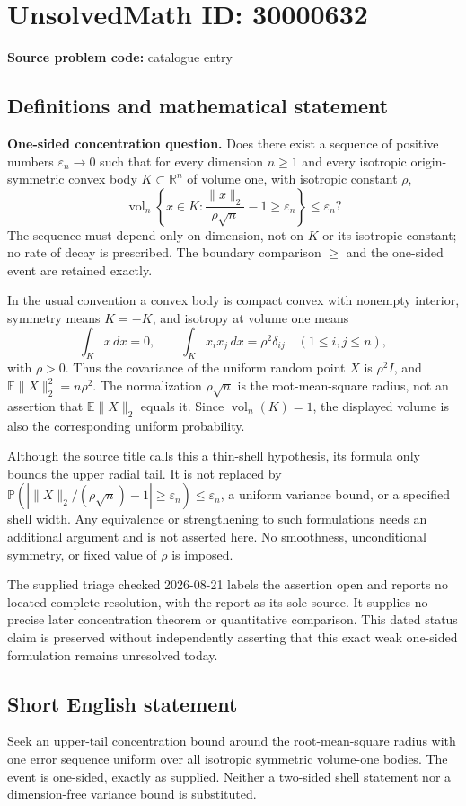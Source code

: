 \documentclass[11pt]{article}
\newcommand{\R}{\mathbb{R}}
\begin{document}
\section*{UnsolvedMath ID: 30000632}
\textbf{Source problem code:} catalogue entry
\subsection{Definitions and mathematical statement}
\textbf{One-sided concentration question.} Does there exist a sequence of positive numbers \(\varepsilon_n\to0\) such that for every dimension \(n\ge1\) and every isotropic origin-symmetric convex body \(K\subset\R^n\) of volume one, with isotropic constant \(\rho\),\[\operatorname{vol}_n\left\{x\in K:\frac{\|x\|_2}{\rho\sqrt n}-1\ge\varepsilon_n\right\}\le\varepsilon_n?\] The sequence must depend only on dimension, not on \(K\) or its isotropic constant; no rate of decay is prescribed. The boundary comparison \(\ge\) and the one-sided event are retained exactly.\par In the usual convention a convex body is compact convex with nonempty interior, symmetry means \(K=-K\), and isotropy at volume one means\[\int_Kx\,dx=0,\qquad \int_Kx_ix_j\,dx=\rho^2\delta_{ij}\quad(1\le i,j\le n),\] with \(\rho>0\). Thus the covariance of the uniform random point \(X\) is \(\rho^2I\), and \(\mathbb E\|X\|_2^2=n\rho^2\). The normalization \(\rho\sqrt n\) is the root-mean-square radius, not an assertion that \(\mathbb E\|X\|_2\) equals it. Since \(\operatorname{vol}_n(K)=1\), the displayed volume is also the corresponding uniform probability.\par Although the source title calls this a thin-shell hypothesis, its formula only bounds the upper radial tail. It is not replaced by \(\mathbb P(|\|X\|_2/(\rho\sqrt n)-1|\ge\varepsilon_n)\le\varepsilon_n\), a uniform variance bound, or a specified shell width. Any equivalence or strengthening to such formulations needs an additional argument and is not asserted here. No smoothness, unconditional symmetry, or fixed value of \(\rho\) is imposed.\par The supplied triage checked 2026-08-21 labels the assertion open and reports no located complete resolution, with the report as its sole source. It supplies no precise later concentration theorem or quantitative comparison. This dated status claim is preserved without independently asserting that this exact weak one-sided formulation remains unresolved today.
\subsection{Short English statement}
Seek an upper-tail concentration bound around the root-mean-square radius with one error sequence uniform over all isotropic symmetric volume-one bodies. The event is one-sided, exactly as supplied. Neither a two-sided shell statement nor a dimension-free variance bound is substituted.
\end{document}
